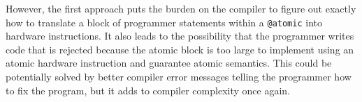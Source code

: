  However, the first approach puts the burden on the compiler to figure out
exactly how to translate a block of programmer statements within a
\texttt{@atomic} into hardware instructions. It also leads to the possibility
that the programmer writes code that is rejected because the atomic block is
too large to implement using an atomic hardware instruction and guarantee
atomic semantics. This could be potentially solved by better compiler error
messages telling the programmer how to fix the program, but it adds to compiler
complexity once again.
